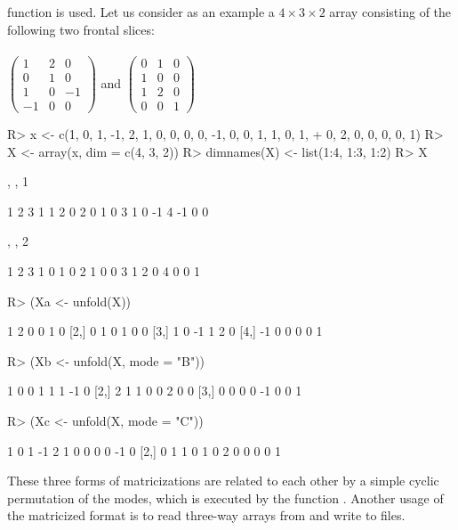 \documentclass[article,shortnames, nojss]{jss}
\begin{document}
function  is used. Let us consider as an example
\citep[][Section 2.6]{kiers2000towards} a $4 \times 3 \times 2$ array
consisting of the following two frontal slices:\\\\
$\begin{pmatrix}
1 & 2 & 0\\
0 & 1 & 0\\
1 & 0 & -1\\
-1 & 0 & 0
\end{pmatrix}$ and
$\begin{pmatrix}
0 & 1 & 0\\
1 & 0 & 0\\
1 & 2 & 0\\
0 & 0 & 1
\end{pmatrix}$

\begin{Schunk}
\begin{Sinput}
R> x <- c(1, 0, 1, -1, 2, 1, 0, 0, 0, 0, -1, 0, 0, 1, 1, 0, 1,
+      0, 2, 0, 0, 0, 0, 1)
R> X <- array(x, dim = c(4, 3, 2))
R> dimnames(X) <- list(1:4, 1:3, 1:2)
R> X
\end{Sinput}
\begin{Soutput}
, , 1

   1 2  3
1  1 2  0
2  0 1  0
3  1 0 -1
4 -1 0  0

, , 2

  1 2 3
1 0 1 0
2 1 0 0
3 1 2 0
4 0 0 1
\end{Soutput}
\begin{Sinput}
R> (Xa <- unfold(X))
\end{Sinput}
\begin{Soutput}
     [,1] [,2] [,3] [,4] [,5] [,6]
[1,]    1    2    0    0    1    0
[2,]    0    1    0    1    0    0
[3,]    1    0   -1    1    2    0
[4,]   -1    0    0    0    0    1
\end{Soutput}
\begin{Sinput}
R> (Xb <- unfold(X, mode = "B"))
\end{Sinput}
\begin{Soutput}
     [,1] [,2] [,3] [,4] [,5] [,6] [,7] [,8]
[1,]    1    0    0    1    1    1   -1    0
[2,]    2    1    1    0    0    2    0    0
[3,]    0    0    0    0   -1    0    0    1
\end{Soutput}
\begin{Sinput}
R> (Xc <- unfold(X, mode = "C"))
\end{Sinput}
\begin{Soutput}
     [,1] [,2] [,3] [,4] [,5] [,6] [,7] [,8] [,9] [,10] [,11] [,12]
[1,]    1    0    1   -1    2    1    0    0    0     0    -1     0
[2,]    0    1    1    0    1    0    2    0    0     0     0     1
\end{Soutput}
\end{Schunk}
These three forms of matricizations are related to each other by a
simple cyclic permutation of the modes, which is executed by
the function . Another usage of the matricized
format is to read three-way arrays from and write to files.
\end{document}
